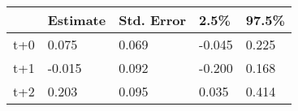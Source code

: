 \begin{tabular}{lllll}
  \toprule
  & Estimate & Std. Error & 2.5\% & 97.5\% \\ 
  \midrule
t+0 & 0.075 & 0.069 & -0.045 & 0.225 \\ 
  t+1 & -0.015 & 0.092 & -0.200 & 0.168 \\ 
  t+2 & 0.203 & 0.095 & 0.035 & 0.414 \\ 
   \bottomrule
\end{tabular}

